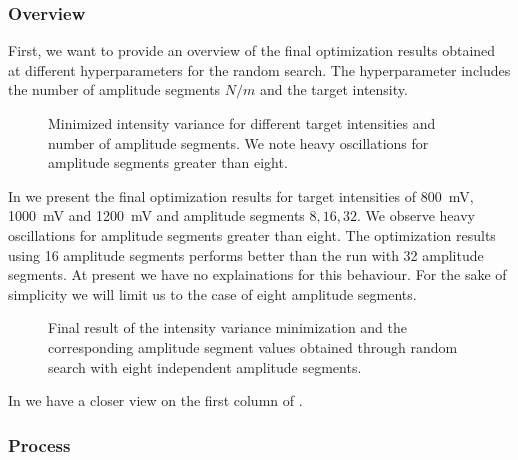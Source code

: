 \subsubsection{Overview}

First, we want to provide an overview of the final optimization results
obtained at different hyperparameters for the random search. The
hyperparameter includes the number of amplitude segments $N/m$ and the target
intensity.
\begin{figure}[htb]
  \centering
  \begin{adjustbox}{width=\textwidth}
  \end{adjustbox}
  \caption{Minimized intensity variance for different target intensities
    and number of amplitude segments. We note heavy oscillations for
    amplitude segments greater than eight.
  }\label{fig:intensity_optimization_overview}
\end{figure}
In  we present the final
optimization results for target intensities of \SI{800}{\milli\volt},
\SI{1000}{\milli\volt} and \SI{1200}{\milli\volt} and amplitude segments
$8,16,32$. We observe heavy oscillations for amplitude segments greater than
eight. The optimization results using \num{16} amplitude segments performs
better than the run with \num{32} amplitude segments. At present we have no
explainations for this behaviour. For the sake of simplicity we will limit us
to the case of eight amplitude segments.
\begin{figure}[htb]
  \centering
  \begin{adjustbox}{width=\textwidth}
  \end{adjustbox}
  \caption{Final result of the intensity variance minimization and the
    corresponding amplitude segment values obtained through random search with
    eight independent amplitude segments.
  }\label{fig:intensity_optimization_intensity_amplitude}
\end{figure}
In  we have a closer
view on the first column of .

\subsubsection{Process}

